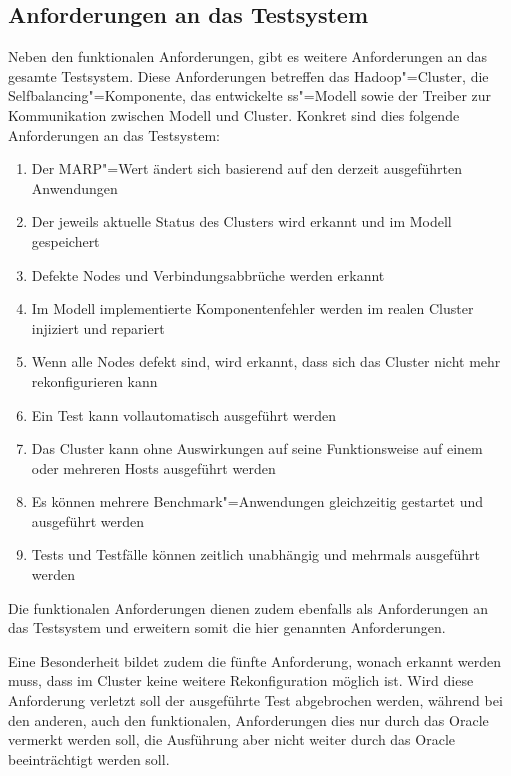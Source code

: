 \subsection{Anforderungen an das Testsystem}
\label{subsec:testRequirements}

Neben den funktionalen Anforderungen, gibt es weitere Anforderungen an das gesamte Testsystem.
Diese Anforderungen betreffen das Hadoop"=Cluster, die Selfbalancing"=Komponente, das entwickelte \ac{ss}"=Modell sowie der Treiber zur Kommunikation zwischen Modell und Cluster.
Konkret sind dies folgende Anforderungen an das Testsystem:

\begin{enumerate}
    \item Der \ac{MARP}"=Wert ändert sich basierend auf den derzeit ausgeführten Anwendungen
    \item Der jeweils aktuelle Status des Clusters wird erkannt und im Modell gespeichert
    \item Defekte Nodes und Verbindungsabbrüche werden erkannt
    \item Im Modell implementierte Komponentenfehler werden im realen Cluster injiziert und repariert
    \item Wenn alle Nodes defekt sind, wird erkannt, dass sich das Cluster nicht mehr rekonfigurieren kann
    \item Ein Test kann vollautomatisch ausgeführt werden
    \item Das Cluster kann ohne Auswirkungen auf seine Funktionsweise auf einem oder mehreren Hosts ausgeführt werden
    \item Es können mehrere Benchmark"=Anwendungen gleichzeitig gestartet und ausgeführt werden
    \item Tests und Testfälle können zeitlich unabhängig und mehrmals ausgeführt werden
\end{enumerate}

Die funktionalen Anforderungen dienen zudem ebenfalls als Anforderungen an das Testsystem und erweitern somit die hier genannten Anforderungen.

Eine Besonderheit bildet zudem die fünfte Anforderung, wonach erkannt werden muss, dass im Cluster keine weitere Rekonfiguration möglich ist.
Wird diese Anforderung verletzt soll der ausgeführte Test abgebrochen werden, während bei den anderen, auch den funktionalen, Anforderungen dies nur durch das Oracle vermerkt werden soll, die Ausführung aber nicht weiter durch das Oracle beeinträchtigt werden soll.
